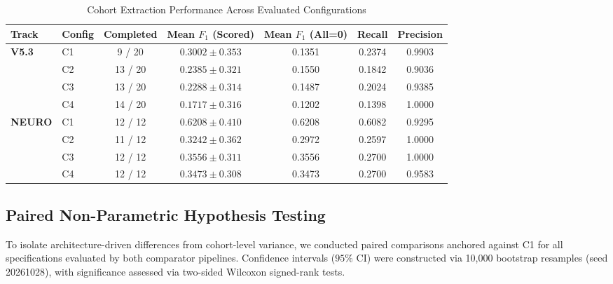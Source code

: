 \begin{table}[htbp]
\centering
\caption{Cohort Extraction Performance Across Evaluated Configurations}
\label{tab:main_results}
\begin{tabular}{llccccc}
\hline
\textbf{Track} & \textbf{Config} & \textbf{Completed} & \textbf{Mean $F_1$ (Scored)} & \textbf{Mean $F_1$ (All=0)} & \textbf{Recall} & \textbf{Precision} \\
\hline
\textbf{V5.3}  & C1 & 9 / 20  & $0.3002 \pm 0.353$ & 0.1351 & 0.2374 & 0.9903 \\
               & C2 & 13 / 20 & $0.2385 \pm 0.321$ & 0.1550 & 0.1842 & 0.9036 \\
               & C3 & 13 / 20 & $0.2288 \pm 0.314$ & 0.1487 & 0.2024 & 0.9385 \\
               & C4 & 14 / 20 & $0.1717 \pm 0.316$ & 0.1202 & 0.1398 & 1.0000 \\
\hline
\textbf{NEURO} & C1 & 12 / 12 & $0.6208 \pm 0.410$ & 0.6208 & 0.6082 & 0.9295 \\
               & C2 & 11 / 12 & $0.3242 \pm 0.362$ & 0.2972 & 0.2597 & 1.0000 \\
               & C3 & 12 / 12 & $0.3556 \pm 0.311$ & 0.3556 & 0.2700 & 1.0000 \\
               & C4 & 12 / 12 & $0.3473 \pm 0.308$ & 0.3473 & 0.2700 & 0.9583 \\
\hline
\end{tabular}
\end{table}

\subsection{Paired Non-Parametric Hypothesis Testing}
To isolate architecture-driven differences from cohort-level variance, we conducted paired comparisons anchored against C1 for all specifications evaluated by both comparator pipelines. Confidence intervals ($95\%$ CI) were constructed via 10,000 bootstrap resamples (seed 20261028), with significance assessed via two-sided Wilcoxon signed-rank tests.

